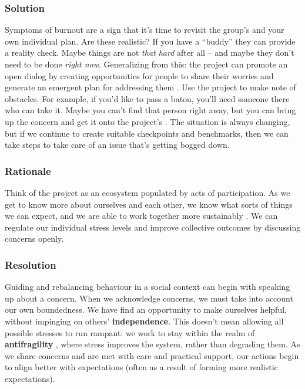 \subsubsection*{Solution}

Symptoms of burnout are a sign that it's time to revisit the group's  and your own individual plan.  Are these realistic?  If you have a ``buddy'' they can provide a reality check.   Maybe things are not \emph{that hard} after all -- and maybe they don't need to be done \emph{right now}.  Generalizing from this: the project can promote an open dialog by creating opportunities for people to share their worries and generate an emergent plan for addressing them \cite{seikkula2006dialogical}.  Use the project  to make note of obstacles.  For example, if you'd like to pass a baton, you'll need someone there who can take it.  Maybe you can't find that person right away, but you can bring up the concern and get it onto the project's .  The situation is always changing, but if we continue to create suitable checkpoints and benchmarks, then we can take steps to take care of an issue that's getting bogged down.    

\subsubsection*{Rationale}

Think of the project as an ecosystem populated by acts of participation.  As we get to know more about ourselves and each other, we know what sorts of things we can expect, and we are able to work together more sustainably \cite{ostrom2010revising}.
%
We can regulate our individual stress levels and improve collective outcomes by discussing concerns openly.

\subsubsection*{Resolution}

Guiding and rebalancing behaviour in a social context can begin with speaking up about a concern.  When we acknowledge concerns, we must take into account our own boundedness.  We have find an opportunity to make ourselves helpful, without impinging on others' \textbf{independence}.   This doesn't mean allowing all possible stresses to run rampant: we work to stay within the realm of \textbf{antifragility} \cite{taleb2012antifragile}, where stress improves the system, rather than degrading them. 
%
As we share concerns and are met with care and practical support, our actions begin to align better with expectations (often as a result of forming more realistic expectations). 

